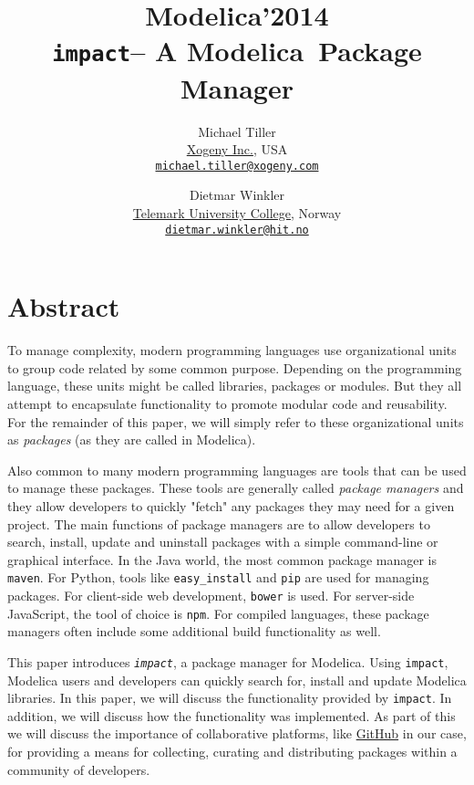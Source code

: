 \documentclass[11pt,a4paper,twocolumn]{article}
\newcommand{\myr}{\textsuperscript{\textregistered}}
\newcommand{\impact}{\texttt{impact}} %
\newcommand{\code}[1]{\texttt{#1}} %
\begin{document}
\title{\textbf{{\small Modelica'2014}\\
    \impact -- A Modelica\myr\ Package Manager}}

\author{Michael Tiller\\\href{http://xogeny.com}{Xogeny Inc.}, USA\\\href{mailto:michael.tiller@xogeny.com}{\nolinkurl{michael.tiller@xogeny.com}} %
        \and Dietmar Winkler\\\href{http://www.hit.no}{Telemark University College}, Norway\\\href{mailto:dietmar.winkler@hit.no}{\nolinkurl{dietmar.winkler@hit.no}}}
\date{} %
\maketitle\thispagestyle{empty} %

\section*{Abstract}

To manage complexity, modern programming languages use organizational units to
group code related by some common purpose.  Depending on the programming
language, these units might be called libraries, packages or modules.  But
they all attempt to encapsulate functionality to promote modular code and
reusability.  For the remainder of this paper, we will simply refer to these
organizational units as \emph{packages} (as they are called in Modelica).

Also common to many modern programming languages are tools that can be
used to manage these packages.  These tools are generally called
\emph{package managers} and they allow developers to quickly "fetch" any
packages they may need for a given project.  The main functions of package
managers are to allow developers to search, install, update and uninstall
packages with a simple command-line or graphical interface.  In the Java
world, the most common package manager is \code{maven}.  For Python, tools
like \code{easy\_install} and \code{pip} are used for managing packages.  For
client-side web development, \code{bower} is used.  For server-side
JavaScript, the tool of choice is \code{npm}.  For compiled languages, these
package managers often include some additional build functionality as well.

This paper introduces \emph{\impact}, a package manager for Modelica. Using
\impact, Modelica users and developers can quickly search for, install and
update Modelica libraries.  In this paper, we will discuss the functionality
provided by \impact.  In addition, we will discuss how the functionality was
implemented.  As part of this we will discuss the importance of collaborative
platforms, like \href{https://github.com}{GitHub} in our case, for providing a
means for collecting, curating and distributing packages within a community of
developers.
\end{document}
